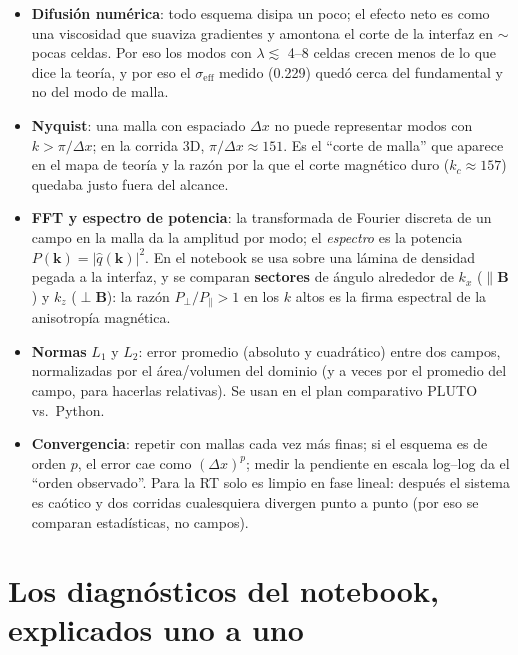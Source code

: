\documentclass[11pt,a4paper]{article}
\newcommand{\B}{\mathbf{B}}
\newcommand{\term}[1]{\textbf{#1}}
\begin{document}
\begin{itemize}[nosep]
  \item \term{Difusión numérica}: todo esquema disipa un poco; el efecto neto es como una
  viscosidad que suaviza gradientes y amontona el corte de la interfaz en
  $\sim$ pocas celdas. Por eso los modos con $\lambda\lesssim$ 4--8 celdas crecen menos de
  lo que dice la teoría, y por eso el $\sigma_\mathrm{eff}$ medido (0.229) quedó cerca del
  fundamental y no del modo de malla.
  \item \term{Nyquist}: una malla con espaciado $\Delta x$ no puede representar modos con
  $k>\pi/\Delta x$; en la corrida 3D, $\pi/\Delta x\approx151$. Es el ``corte de malla''
  que aparece en el mapa de teoría y la razón por la que el corte magnético duro
  ($k_c\approx157$) quedaba justo fuera del alcance.
  \item \term{FFT y espectro de potencia}: la transformada de Fourier discreta de un campo
  en la malla da la amplitud por modo; el \emph{espectro} es la potencia
  $P(\mathbf{k})=|\hat{q}(\mathbf{k})|^2$. En el notebook se usa sobre una lámina de
  densidad pegada a la interfaz, y se comparan \term{sectores} de ángulo alrededor de
  $k_x$ ($\parallel\B$) y $k_z$ ($\perp\B$): la razón $P_\perp/P_\parallel>1$ en los $k$
  altos es la firma espectral de la anisotropía magnética.
  \item \term{Normas} $L_1$ y $L_2$: error promedio (absoluto y cuadrático) entre dos
  campos, normalizadas por el área/volumen del dominio (y a veces por el promedio del
  campo, para hacerlas relativas). Se usan en el plan comparativo PLUTO vs.\ Python.
  \item \term{Convergencia}: repetir con mallas cada vez más finas; si el esquema es de
  orden $p$, el error cae como $(\Delta x)^p$; medir la pendiente en escala log--log da el
  ``orden observado''. Para la RT solo es limpio en fase lineal: después el sistema es
  caótico y dos corridas cualesquiera divergen punto a punto (por eso se comparan
  estadísticas, no campos).
\end{itemize}

\section{Los diagnósticos del notebook, explicados uno a uno}
\end{document}
